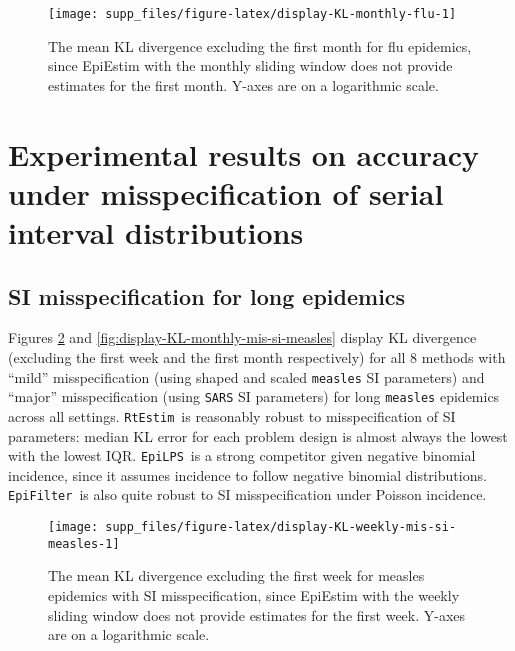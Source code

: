 \documentclass[
]{article}
\begin{document}
\begin{figure}[!ht]

{\centering \texttt{[image: supp\_files/figure-latex/display-KL-monthly-flu-1]} 

}

\caption{The mean KL divergence excluding the first month for flu epidemics, since EpiEstim with the monthly sliding window does not provide estimates for the first month. Y-axes are on a logarithmic scale.}\label{fig:display-KL-monthly-flu}
\end{figure}

\clearpage

\section{Experimental results on accuracy under misspecification of serial interval distributions}\label{experimental-results-on-accuracy-under-misspecification-of-serial-interval-distributions}

\subsection{SI misspecification for long epidemics}\label{si-misspecification-for-long-epidemics}

Figures \ref{fig:display-KL-weekly-mis-si-measles} and
\ref{fig:display-KL-monthly-mis-si-measles} display KL divergence (excluding
the first week and the first month respectively) for all 8 methods with ``mild''
misspecification (using shaped and scaled \texttt{measles} SI parameters) and ``major''
misspecification (using \texttt{SARS} SI parameters) for long \texttt{measles} epidemics across all
settings. \texttt{RtEstim}~is reasonably robust to misspecification of SI parameters:
median KL error for each problem design is almost always the lowest with the lowest
IQR. \texttt{EpiLPS}~is a strong competitor given negative binomial incidence, since it
assumes incidence to follow negative binomial distributions. \texttt{EpiFilter}~is also
quite robust to SI misspecification under Poisson incidence.

\begin{figure}[!ht]

{\centering \texttt{[image: supp\_files/figure-latex/display-KL-weekly-mis-si-measles-1]} 

}

\caption{The mean KL divergence excluding the first week for measles epidemics with SI misspecification, since EpiEstim with the weekly sliding window does not provide estimates for the first week. Y-axes are on a logarithmic scale.}\label{fig:display-KL-weekly-mis-si-measles}
\end{figure}
\end{document}
